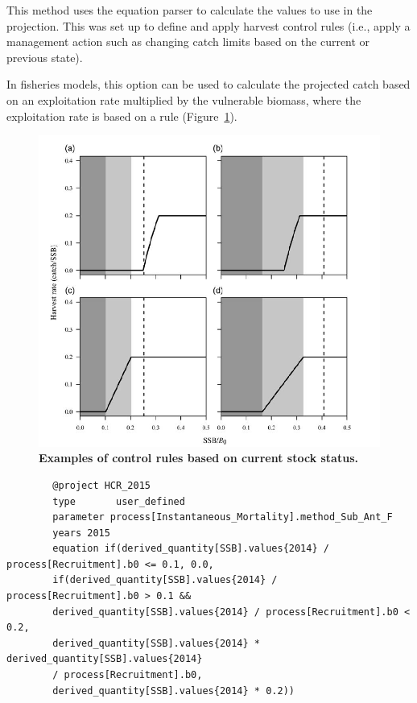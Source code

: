 This method uses the equation parser to calculate the values to use in the projection. This was set up to define and apply harvest control rules (i.e., apply a management action such as changing catch limits based on the current or previous state).

In fisheries models, this option can be used to calculate the projected catch based on an exploitation rate multiplied by the vulnerable biomass, where the exploitation rate is based on a rule (Figure~\ref{fig:HCR}).

\begin{figure}[!h]
	\includegraphics[scale=0.9]{Figures/HarvestControlRules.png}
	\caption{\textbf{Examples of control rules based on current stock status.}}
	\label{fig:HCR}
\end{figure}

\pagebreak
{\small{\begin{verbatim}
		@project HCR_2015
		type       user_defined
		parameter process[Instantaneous_Mortality].method_Sub_Ant_F
		years 2015
		equation if(derived_quantity[SSB].values{2014} / process[Recruitment].b0 <= 0.1, 0.0,
		if(derived_quantity[SSB].values{2014} / process[Recruitment].b0 > 0.1 &&
		derived_quantity[SSB].values{2014} / process[Recruitment].b0 < 0.2,
		derived_quantity[SSB].values{2014} * derived_quantity[SSB].values{2014}
		/ process[Recruitment].b0,
		derived_quantity[SSB].values{2014} * 0.2))
		\end{verbatim}}}

